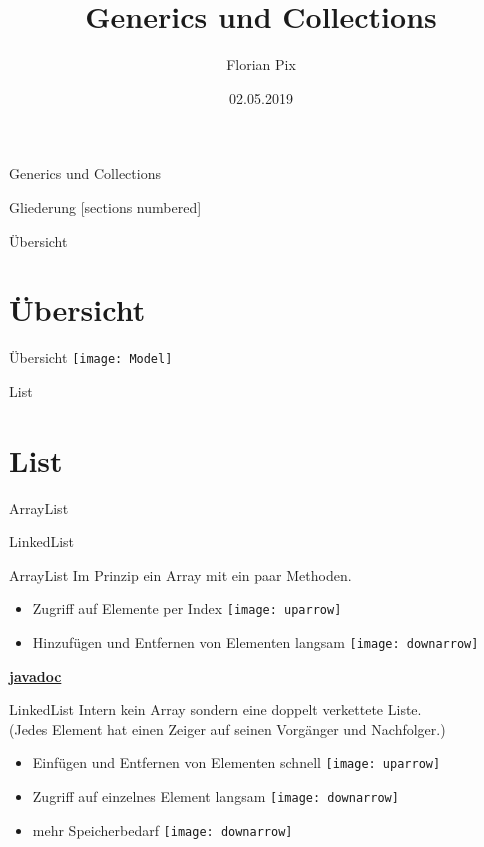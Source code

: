 \documentclass[10pt]{beamer}
\author{Florian Pix}
\institute{SWT Übung SoSe19}
\title{Generics und Collections}
\date{02.05.2019}
\begin{document}
\begin{frame}{Generics und Collections}
    \titlepage
\end{frame}

\begin{frame}{Gliederung}
    [sections numbered]
    \tableofcontents
\end{frame}

\begin{frame}[fragile]{Übersicht}
    \section{Übersicht}
\end{frame}

\begin{frame}[fragile]{Übersicht}
\texttt{[image: Model]}
\end{frame}

\begin{frame}[fragile]{List}
    \section{List}
ArrayList

LinkedList
\end{frame}

\begin{frame}[fragile]{ArrayList}
Im Prinzip ein Array mit ein paar Methoden.

\begin{itemize}
\item Zugriff auf Elemente per Index \texttt{[image: uparrow]}
\item Hinzufügen und Entfernen von Elementen langsam \texttt{[image: downarrow]}
\end{itemize}

\textcolor{mymauve}{\textbf{\href{https://docs.oracle.com/javase/8/docs/api/java/util/ArrayList.html}{javadoc}}}
\end{frame}

\begin{frame}[fragile]{LinkedList}
Intern kein Array sondern eine doppelt verkettete Liste.\\
(Jedes Element hat einen Zeiger auf seinen Vorgänger und Nachfolger.)

\begin{itemize}
\item Einfügen und Entfernen von Elementen schnell \texttt{[image: uparrow]}
\item Zugriff auf einzelnes Element langsam \texttt{[image: downarrow]}
\item mehr Speicherbedarf \texttt{[image: downarrow]}
\end{itemize}
\end{frame}
\end{document}
